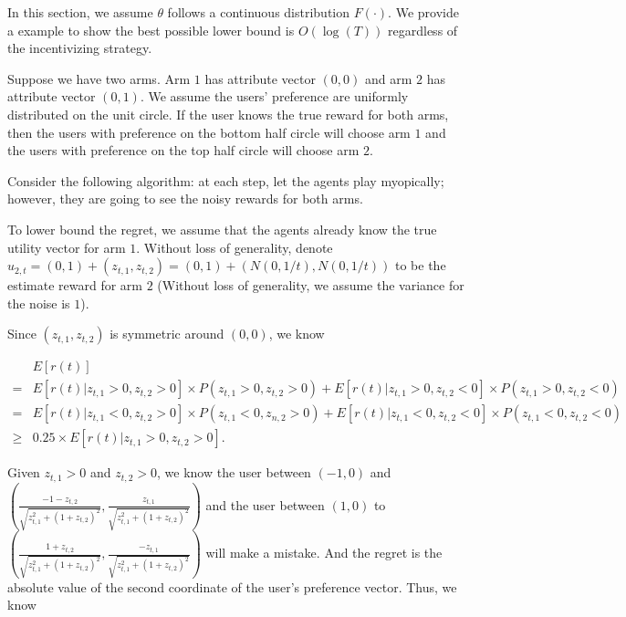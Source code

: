 \documentclass{article}
\begin{document}
In this section, we assume $\theta$ follows a continuous distribution $F(\cdot)$. We provide a example to show the best possible lower bound is $O(\log(T))$ regardless of the incentivizing strategy.

Suppose we have two arms. Arm $1$ has attribute vector $(0,0)$ and arm $2$ has attribute vector $(0,1)$. We assume the users' preference are uniformly distributed on the unit circle. If the user knows the true reward for both arms, then the users with preference on the bottom half circle will choose arm $1$ and the users with preference on the top half circle will choose arm $2$.

Consider the following algorithm: at each step, let the agents play myopically; however, they are going to see the noisy rewards for both arms.

To lower bound the regret, we assume that the agents already know the true utility vector for arm $1$. Without loss of generality, denote $u_{2,t} = (0,1)+(z_{t,1},z_{t,2}) = (0,1)+ (N(0,1/t),N(0,1/t))$ to be the estimate reward for arm $2$ (Without loss of generality, we assume the variance for the noise is $1$). 

Since $(z_{t,1}, z_{t,2})$ is symmetric around $(0,0)$, we know 

\begin{align}
&E[r(t)] \nonumber \\
= &E[r(t) | z_{t,1}>0,z_{t,2}>0] \times P(z_{t,1}>0,z_{t,2}>0) + E[r(t) |z_{t,1}>0,z_{t,2}<0] \times P(z_{t,1}>0,z_{t,2}<0) \nonumber \\
= &E[r(t) | z_{t,1}<0,z_{t,2}>0] \times P(z_{t,1}<0,z_{n,2}>0) + E[r(t) |z_{t,1}<0,z_{t,2}<0] \times P(z_{t,1}<0,z_{t,2}<0) \nonumber \\
\geq & 0.25 \times E[r(t) | z_{t,1}>0, z_{t,2}>0]. \nonumber
\end{align}

Given $z_{t,1}>0$ and $z_{t,2}>0$, we know the user between $(-1,0)$ and $\left(\frac{-1-z_{t,2}}{\sqrt{z_{t,1}^2+(1+z_{t,2})^2}}, \frac{z_{t,1}}{\sqrt{z_{t,1}^2+(1+z_{t,2})^2}}\right)$ and the user between $(1,0)$ to $\left(\frac{1+z_{t,2}}{\sqrt{z_{t,1}^2+(1+z_{t,2})^2}}, \frac{-z_{t,1}}{\sqrt{z_{t,1}^2+(1+z_{t,2})^2}}\right)$ will make a mistake. And the regret is the absolute value of the second coordinate of the user's preference vector. Thus, we know
\end{document}
